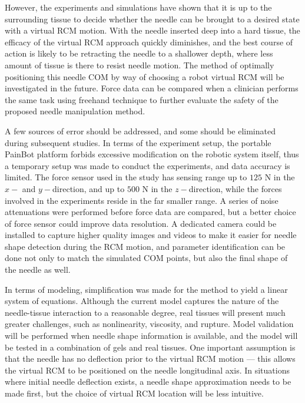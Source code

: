 However, the experiments and simulations have shown that it is up to the surrounding tissue to decide whether the needle can be brought to a desired state with a virtual RCM motion. With the needle inserted deep into a hard tissue, the efficacy of the virtual RCM approach quickly diminishes, and the best course of action is likely to be retracting the needle to a shallower depth, where less amount of tissue is there to resist needle motion. The method of optimally positioning this needle COM by way of choosing a robot virtual RCM will be investigated in the future. Force data can be compared when a clinician performs the same task using freehand technique to further evaluate the safety of the proposed needle manipulation method.

A few sources of error should be addressed, and some should be eliminated during subsequent studies. In terms of the experiment setup, the portable PainBot platform forbids excessive modification on the robotic system itself, thus a temporary setup was made to conduct the experiments, and data accuracy is limited. The force sensor used in the study has sensing range up to $125$ N in the $x-$ and $y-$direction, and up to $500$ N in the $z-$direction, while the forces involved in the experiments reside in the far smaller range. A series of noise attenuations were performed before force data are compared, but a better choice of force sensor could improve data resolution. A dedicated camera could be installed to capture higher quality images and videos to make it easier for needle shape detection during the RCM motion, and parameter identification can be done not only to match the simulated COM points, but also the final shape of the needle as well.

In terms of modeling, simplification was made for the method to yield a linear system of equations. Although the current model captures the nature of the needle-tissue interaction to a reasonable degree, real tissues will present much greater challenges, such as nonlinearity, viscosity, and rupture. Model validation will be performed when needle shape information is available, and the model will be tested in a combination of gels and real tissues. One important assumption is that the needle has no deflection prior to the virtual RCM motion --- this allows the virtual RCM to be positioned on the needle longitudinal axis. In situations where initial needle deflection exists, a needle shape approximation needs to be made first, but the choice of virtual RCM location will be less intuitive.

